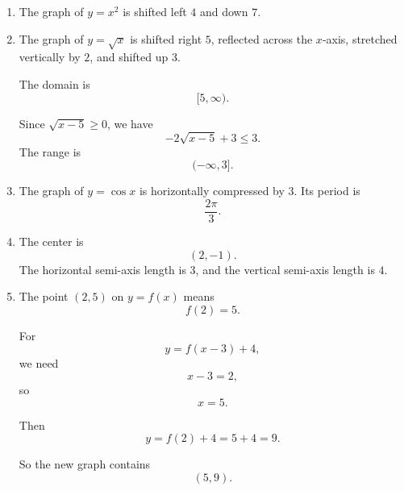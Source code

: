 \begin{enumerate}
\item
The graph of \(y=x^2\) is shifted left \(4\) and down \(7\).

\item
The graph of \(y=\sqrt{x}\) is shifted right \(5\), reflected across the \(x\)-axis,
stretched vertically by \(2\), and shifted up \(3\).

The domain is
\[
[5,\infty).
\]

Since \(\sqrt{x-5}\ge0\), we have
\[
-2\sqrt{x-5}+3\le3.
\]
The range is
\[
(-\infty,3].
\]

\item
The graph of \(y=\cos x\) is horizontally compressed by \(3\).  Its period is
\[
\frac{2\pi}{3}.
\]

\item
The center is
\[
(2,-1).
\]
The horizontal semi-axis length is \(3\), and the vertical semi-axis length is \(4\).

\item
The point \((2,5)\) on \(y=f(x)\) means
\[
f(2)=5.
\]

For
\[
y=f(x-3)+4,
\]
we need
\[
x-3=2,
\]
so
\[
x=5.
\]

Then
\[
y=f(2)+4=5+4=9.
\]

So the new graph contains
\[
\boxed{(5,9).}
\]
\end{enumerate}